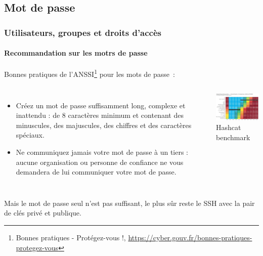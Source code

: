\documentclass{beamer}
\begin{document}
    \subsection{Mot de passe}\label{subsec:password}
    \begin{frame}
        \transdissolve
        \frametitle{Utilisateurs, groupes et droits d'accès}
        \framesubtitle{Recommandation sur les motrs de passe}
        \begin{footnotesize}
            Bonnes pratiques de l'ANSSI\footnote{Bonnes pratiques - Protégez-vous !, \url{https://cyber.gouv.fr/bonnes-pratiques-protegez-vous}} pour les mots de passe~:
            \begin{columns}
                \begin{itemize}
                    \item Créez un mot de passe suffisamment long, complexe et inattendu :
                    de 8 caractères minimum et contenant des minuscules, des majuscules,
                    des chiffres et des caractères spéciaux.

                    \item Ne communiquez jamais votre mot de passe à un tiers : aucune
                    organisation ou personne de confiance ne vous demandera de lui
                    communiquer votre mot de passe.

                \end{itemize}
                \centering
                \includegraphics[width=6.5cm]{image/real-password-cracking} \\ Hashcat benchmark\footnotemark \\
            \end{columns}
            Mais le mot de passe seul n'est pas suffisant, le plus sûr reste le SSH avec la pair de clés privé et publique.
        \end{footnotesize}
    \end{frame}
\end{document}
